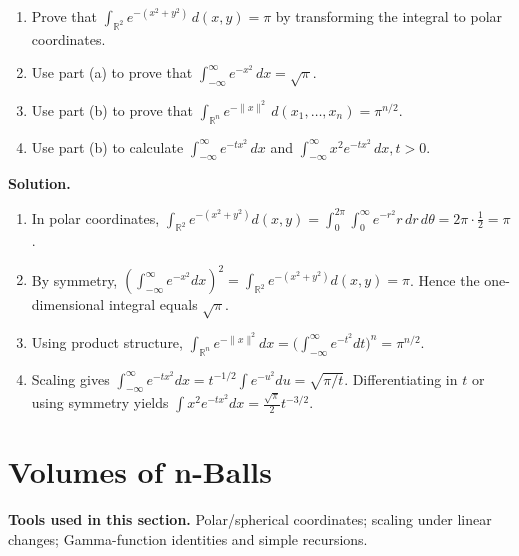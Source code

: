 \begin{problembox}
\begin{enumerate}[label=(\alph*)]
\item Prove that \(\int_{\mathbb{R}^2} e^{-(x^2 + y^2)} \, d(x, y) = \pi\) by transforming the integral to polar coordinates.
\item Use part (a) to prove that \(\int_{-\infty}^{\infty} e^{-x^2} \, dx = \sqrt{\pi}\).
\item Use part (b) to prove that \(\int_{\mathbb{R}^n} e^{-\|x\|^2} \, d(x_1, \ldots, x_n) = \pi^{n/2}\).
\item Use part (b) to calculate \(\int_{-\infty}^{\infty} e^{-tx^2} \, dx\) and \(\int_{-\infty}^{\infty} x^2 e^{-tx^2} \, dx, t > 0\).
\end{enumerate}
\end{problembox}

\noindent\textbf{Solution.}
\begin{enumerate}[label=(\alph*)]
\item In polar coordinates,
\(\int_{\mathbb{R}^2} e^{-(x^2+y^2)} d(x,y)=\int_0^{2\pi}\int_0^{\infty} e^{-r^2} r\,dr\,d\theta=2\pi\cdot\tfrac12=\pi\).
\item By symmetry, \(\left(\int_{-\infty}^{\infty} e^{-x^2}dx\right)^2=\int_{\mathbb{R}^2} e^{-(x^2+y^2)}d(x,y)=\pi\). Hence the one-dimensional integral equals \(\sqrt{\pi}\).
\item Using product structure, \(\int_{\mathbb{R}^n} e^{-\|x\|^2}dx=\big(\int_{-\infty}^{\infty} e^{-t^2}dt\big)^n=\pi^{n/2}\).
\item Scaling gives \(\int_{-\infty}^{\infty} e^{-t x^2} dx = t^{-1/2}\int e^{-u^2}du = \sqrt{\pi/t}\). Differentiating in \(t\) or using symmetry yields \(\int x^2 e^{-t x^2} dx = \tfrac{\sqrt{\pi}}{2} t^{-3/2}\).
\end{enumerate}

\section{Volumes of n-Balls}

\noindent\textbf{Tools used in this section.} Polar/spherical coordinates; scaling under linear changes; Gamma-function identities and simple recursions.

